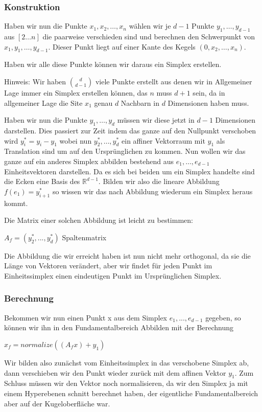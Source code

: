         \subsubsection*{Konstruktion}
            Haben wir nun die Punkte $x_1, x_2, \dots, x_n$ wählen wir je $d-1$ Punkte $y_1, \dots, y_{d-1}$ aus $[2 \dots n]$ die paarweise verschieden sind und berechnen den Schwerpunkt von $x_1, y_1, \dots, y_{d-1}$. Dieser Punkt liegt auf einer Kante des Kegels $(0, x_2, \dots, x_n)$.

            Haben wir alle diese Punkte können wir daraus ein Simplex erstellen.

            Hinweis: Wir haben $d\choose{d-1}$ viele Punkte erstellt aus denen wir in Allgemeiner Lage immer ein Simplex erstellen können, das $n$ muss $d+1$ sein, da in allgemeiner Lage die Site $x_1$ genau $d$ Nachbarn in $d$ Dimensionen haben muss.

            Haben wir nun die Punkte $y_1, \dots, y_d$ müssen wir diese jetzt in $d - 1$ Dimensionen darstellen. Dies passiert zur Zeit indem das ganze auf den Nullpunkt verschoben wird $y_i^* = y_i - y_1$ wobei nun $y_2^*, \dots, y_d^*$ ein affiner Vektorraum mit $y_1$ als Translation sind um auf den Ursprünglichen zu kommen. Nun wollen wir das ganze auf ein anderes Simplex abbilden bestehend aus $e_1, \dots, e_{d-1}$ Einheitsvektoren darstellen. Da es sich bei beiden um ein Simplex handelte sind die Ecken eine Basis des $\mathbb{R}^{d-1}$. Bilden wir also die lineare Abbildung $f(e_1) = y_{i+1}^*$ so wissen wir das nach Abbildung wiederum ein Simplex heraus kommt.

            Die Matrix einer solchen Abbildung ist leicht zu bestimmen:

            $A_f = ( y_2^*, ..., y_d^* )$ Spaltenmatrix

            Die Abbildung die wir erreicht haben ist nun nicht mehr orthogonal, da sie die Länge von Vektoren verändert, aber wir findet für jeden Punkt im Einheitssimplex einen eindeutigen Punkt im Ursprünglichen Simplex.
            
        \subsubsection*{Berechnung}
            Bekommen wir nun einen Punkt x aus dem Simplex $e_1, ..., e_{d-1}$ gegeben, so können wir ihn in den Fundamentalbereich Abbilden mit der Berechnung

            $x_f = normalize((A_f x) + y_1)$

            Wir bilden also zunächst vom Einheitssimplex in das verschobene Simplex ab, dann verschieben wir den Punkt wieder zurück mit dem affinen Vektor $y_1$. Zum Schluss müssen wir den Vektor noch normalisieren, da wir den Simplex ja mit einem Hyperebenen schnitt berechnet haben, der eigentliche Fundamentalbereich aber auf der Kugeloberfläche war.